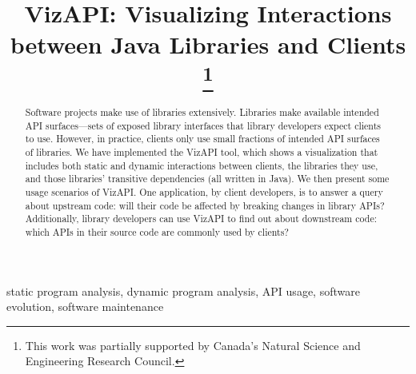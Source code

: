 \documentclass[conference]{IEEEtran}
\begin{document}
\title{VizAPI: Visualizing Interactions between Java Libraries and Clients
\thanks{This work was partially supported by Canada's Natural Science and Engineering Research Council.}
}

\author{
\and
{}
}

\maketitle

\begin{abstract}
Software projects make use of libraries extensively. Libraries make available intended API surfaces—sets of exposed library interfaces that library developers expect clients to use. However, in practice, clients only use small fractions of intended API surfaces of libraries. We have implemented the VizAPI tool, which shows a visualization that includes both static and dynamic interactions between clients, the libraries they use, and  those libraries’ transitive dependencies (all written in Java). We then present some usage scenarios of VizAPI. One application, by client developers, is to answer a query about upstream code: will their code be affected by breaking changes in library APIs? Additionally, library developers can use VizAPI to find out about downstream code: which APIs in their source code are commonly used by clients? 
\end{abstract}

\begin{IEEEkeywords}
static program analysis,
dynamic program analysis,
API usage,
software evolution,
software maintenance
\end{IEEEkeywords}
\end{document}
